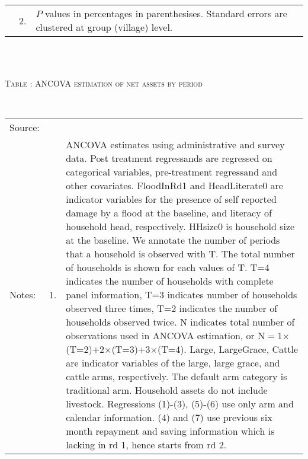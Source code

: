 \begin{minipage}[t]{14cm}
\begin{tabular}{>{\hfill\scriptsize}p{1cm}<{}>{\hfill\scriptsize}p{.25cm}<{}>{\scriptsize}p{12cm}<{\hfill}}
& 2. &  $P$ values in percentages in parenthesises. Standard errors are clustered at group (village) level. %
 \end{tabular}
\end{minipage} \\\\\hspace{-1cm}\begin{minipage}[t]{14cm} \hfil\textsc{\normalsize Table \thetable: ANCOVA estimation of net assets by period\label{tab ANCOVA narrow net assets timevarying}}\\ \setlength{\tabcolsep}{1pt}
  \setlength{\baselineskip}{8pt}
  \renewcommand{\arraystretch}{.55}
  \hfil{}\\
\renewcommand{\arraystretch}{.8}
\setlength{\tabcolsep}{1pt} \begin{tabular}{>{\hfill\scriptsize}p{1cm}<{}>{\hfill\scriptsize}p{.25cm}<{}>{\scriptsize}p{12cm}<{\hfill}} 
Source:& \multicolumn{2}{l}{\scriptsize Estimated with GUK administrative and survey data.}\\
Notes: & 1. & ANCOVA estimates using administrative and survey data. Post treatment regressands are regressed on categorical variables, pre-treatment regressand and other covariates. \textsf{FloodInRd1} and \textsf{HeadLiterate0} are indicator variables for the presence of self reported damage by a flood at the baseline, and literacy of household head, respectively. \textsf{HHsize0} is household size at the baseline. We annotate the number of periods that a household is observed with \textsf{T}. The total number of households is shown for each values of \textsf{T}. \textsf{T=4} indicates the number of households with complete panel information, \textsf{T=3} indicates number of households observed three times, \textsf{T=2} indicates the number of households observed twice. \textsf{N} indicates total number of observations used in ANCOVA estimation, or \textsf{N$=$1$\times$(T=2)+2$\times$(T=3)+3$\times$(T=4)}.  \textsf{Large}, \textsf{LargeGrace}, \textsf{Cattle} are indicator variables of the \textsf{large}, \textsf{large grace}, and \textsf{cattle} arms, respectively. The default arm category is \textsf{traditional} arm. Household assets do not include livestock. Regressions (1)-(3), (5)-(6) use only arm and calendar information. (4) and (7) use previous six month repayment and saving information which is lacking in rd 1, hence starts from rd 2.\\

\end{tabular}
\end{minipage}
